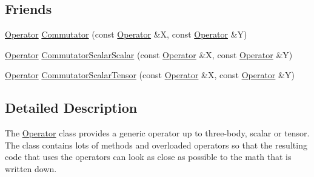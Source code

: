 \subsection*{Friends}
\begin{DoxyCompactItemize}
\item 
\hyperlink{classOperator}{Operator} \hyperlink{classOperator_a88b0cafa371bca287379a0ce89627e2b}{Commutator} (const \hyperlink{classOperator}{Operator} \&X, const \hyperlink{classOperator}{Operator} \&Y)
\item 
\hyperlink{classOperator}{Operator} \hyperlink{classOperator_a0754eb8313c2bfbeda2706978f690f54}{Commutator\-Scalar\-Scalar} (const \hyperlink{classOperator}{Operator} \&X, const \hyperlink{classOperator}{Operator} \&Y)
\item 
\hyperlink{classOperator}{Operator} \hyperlink{classOperator_aed3e3d390498aac92aaad6a75cd90b29}{Commutator\-Scalar\-Tensor} (const \hyperlink{classOperator}{Operator} \&X, const \hyperlink{classOperator}{Operator} \&Y)
\end{DoxyCompactItemize}


\subsection{Detailed Description}
The \hyperlink{classOperator}{Operator} class provides a generic operator up to three-\/body, scalar or tensor. The class contains lots of methods and overloaded operators so that the resulting code that uses the operators can look as close as possible to the math that is written down. 

